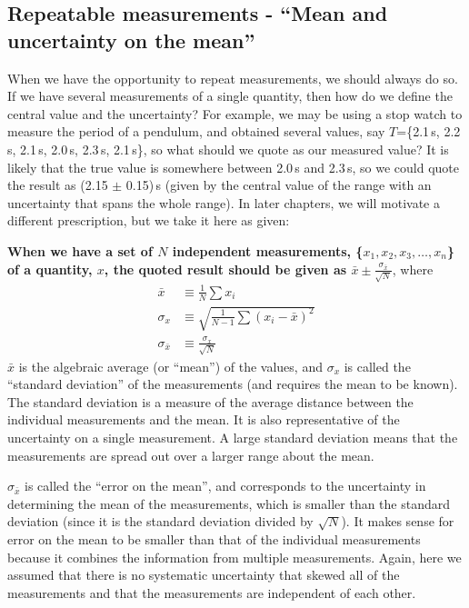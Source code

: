 \subsection{Repeatable measurements - ``Mean and uncertainty on the mean''}
When we have the opportunity to repeat measurements, we should always do so. If we have several measurements of a single quantity, then how do we define the central value and the uncertainty? For example, we may be using a stop watch to measure the period of a pendulum, and obtained several values, say $T$=\{2.1\,s, 2.2\,s, 2.1\,s, 2.0\,s, 2.3\,s, 2.1\,s\}, so what should we quote as our measured value? It is likely that the true value is somewhere between 2.0\,s and 2.3\,s, so we could quote the result as (2.15 $\pm$ 0.15)\,s (given by the central value of the range with an uncertainty that spans the whole range). In later chapters, we will motivate a different prescription, but we take it here as given:

\textbf{When we have a set of $N$ independent measurements, \{$x_1, x_2, x_3, \dots, x_n$\} of a quantity, $x$, the quoted result should be given as $\bar x \pm \frac{\sigma_{\bar x}}{\sqrt{N}}$}, where
\begin{align}
\label{eqn:MeanAndStd}
\bar x &\equiv \frac{1}{N}\sum x_i \nonumber\\
\sigma_x &\equiv \sqrt{\frac{1}{N-1}\sum (x_i-\bar x)^2}\nonumber\\
\sigma_{\bar x} &\equiv \frac{\sigma_x}{\sqrt{N}}
\end{align}
$\bar x$ is the algebraic average (or ``mean'') of the values, and $\sigma_x$ is called the ``standard deviation'' of the measurements (and requires the mean to be known). The standard deviation is a measure of the average distance between the individual measurements and the mean. It is also representative of the uncertainty on a single measurement. A large standard deviation means that the measurements are spread out over a larger range about the mean.

$\sigma_{\bar x}$ is called the ``error on the mean'', and corresponds to the uncertainty in determining the mean of the measurements, which is smaller than the standard deviation (since it is the standard deviation divided by $\sqrt{N}$). It makes sense for error on the mean to be smaller than that of the individual measurements because it combines the information from multiple measurements. Again, here we assumed that there is no systematic uncertainty that skewed all of the measurements and that the measurements are independent of each other.

